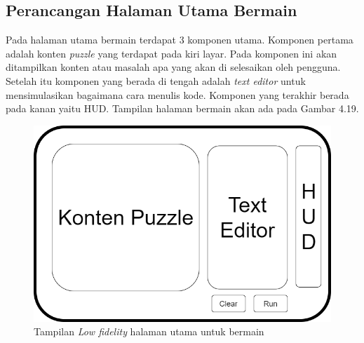 	\subsection{Perancangan Halaman Utama Bermain}
	Pada halaman utama bermain terdapat 3 komponen utama. Komponen pertama adalah konten \textit{puzzle} yang terdapat pada kiri layar. Pada komponen ini akan ditampilkan konten atau masalah apa yang akan di selesaikan oleh pengguna. Setelah itu komponen yang berada di tengah adalah \textit{text editor} untuk mensimulasikan bagaimana cara menulis kode. Komponen yang terakhir berada pada kanan yaitu HUD. Tampilan halaman bermain akan ada pada Gambar 4.19.
	\begin{figure}
		\centering
		\includegraphics[width=\linewidth-80pt]{pics/low/low3}
		\caption{Tampilan \textit{Low fidelity} halaman utama untuk bermain}
	\end{figure}
	
